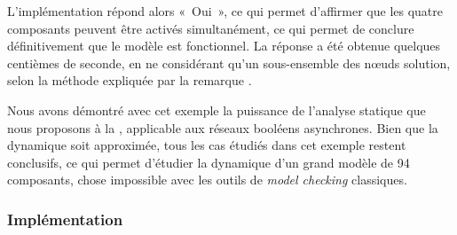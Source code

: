 L'implémentation répond alors «~Oui~», ce qui permet d'affirmer que les quatre composants
peuvent être activés simultanément,
ce qui permet de conclure définitivement que le modèle est fonctionnel.
La réponse a été obtenue quelques centièmes de seconde,
en ne considérant qu'un sous-ensemble des nœuds solution,
selon la méthode expliquée par la remarque .


\myskip

Nous avons démontré avec cet exemple la puissance de l'analyse statique que nous proposons
à la , applicable aux réseaux booléens asynchrones.
Bien que la dynamique soit approximée, tous les cas étudiés dans cet exemple restent conclusifs,
ce qui permet d'étudier la dynamique d'un grand modèle de 94 composants,
chose impossible avec les outils de \textit{model checking} classiques.

\subsubsection*{Implémentation}

